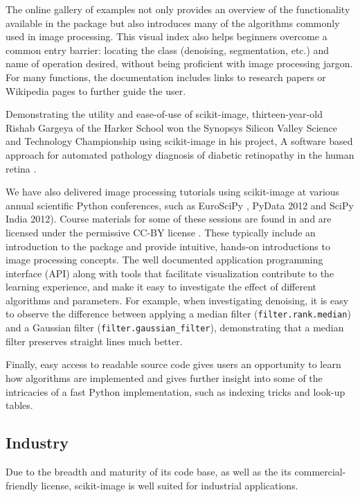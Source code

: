 \documentclass[fleqn,12pt]{wlpeerj}
\begin{document}
The online gallery of examples not only provides
an overview of the functionality available in the package but also
introduces many of the algorithms commonly used in image processing.
This visual index also helps beginners overcome a common entry barrier:
locating the class (denoising, segmentation, etc.) and name of operation
desired, without being proficient with image processing jargon.  For many
functions, the documentation includes links to research papers or Wikipedia
pages to further guide the user.

Demonstrating the utility and ease-of-use of scikit-image, thirteen-year-old
Rishab Gargeya of the Harker School won the Synopsys Silicon
Valley Science and Technology Championship using scikit-image in
his project, \textquotedbl{}A software based approach for automated pathology diagnosis of
diabetic retinopathy in the human retina \citep{sciencefair}.

We have also delivered
image processing tutorials using scikit-image at various
annual scientific Python conferences, such as EuroSciPy \citep{euroscipy2013}, PyData
2012 \citep{pydata2012} and SciPy India
2012). Course materials for some of these sessions are found in
\citep{scipylecturenotes} and are licensed under the permissive CC-BY 
license \citep{cc-by}.  These typically include an introduction to the package and provide
intuitive, hands-on introductions to image processing concepts. The well
documented application programming interface (API) along with tools that
facilitate visualization contribute to the learning experience, and make it
easy to investigate the effect of different algorithms and parameters.
For example, when investigating denoising, it is easy to observe the difference
between applying a median filter (\texttt{filter.rank.median}) and a
Gaussian filter (\texttt{filter.gaussian\_filter}),
demonstrating that a median filter preserves straight lines much better.

Finally, easy access to readable source code gives users an opportunity to
learn how algorithms are implemented and gives further insight into some of the
intricacies of a fast Python implementation, such as indexing tricks
and look-up tables.

\subsection*{Industry}
  \label{industry}

Due to the breadth and maturity of its code base, as well as the its
commercial-friendly license, scikit-image is well suited for
industrial applications.
\end{document}
